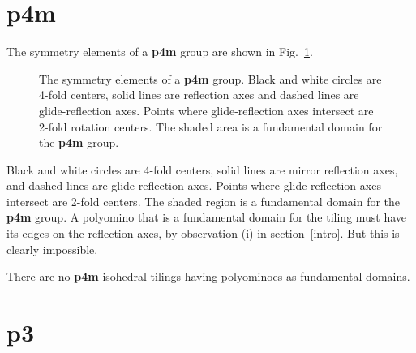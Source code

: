 \documentclass{ws-ijcga}
\begin{document}
\section{{\bf p4m}}
\label{p4m}
The symmetry elements of a {\bf p4m} group are shown in Fig.~\ref{fig:p4m}.
\begin{figure}[h]
\centerline{
}
\vspace*{8pt}
\caption{
The symmetry elements of a {\bf p4m} group. 
Black and white circles are 4-fold centers, solid lines are reflection
axes and dashed lines are glide-reflection axes. 
Points where glide-reflection axes intersect are 2-fold rotation
centers. The shaded area is a fundamental domain for the {\bf p4m} group.
\label{fig:p4m}
}
\end{figure}
Black and white circles are 4-fold centers, solid lines are mirror reflection axes, 
and dashed lines are glide-reflection axes. Points
where glide-reflection axes intersect are 2-fold centers. The shaded region is a fundamental
domain for the {\bf p4m} group. A polyomino that is a fundamental domain for the tiling must have
its edges on the reflection axes, by observation (i) in section~\ref{intro}. 
But this is clearly impossible.

\begin{theorem}
There are no {\bf p4m} isohedral tilings having polyominoes as fundamental domains.
\end{theorem}












\section{{\bf p3}}
\label{p3}
\end{document}
